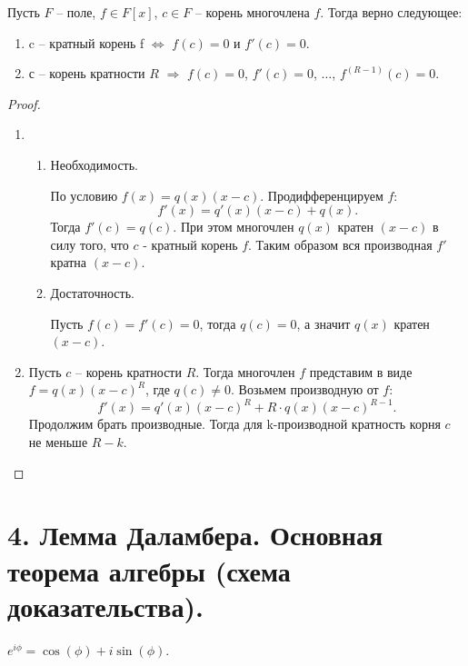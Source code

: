 \begin{theorem}
    Пусть $F$ -- поле, $f \in F[x]$, $c \in F$ -- корень многочлена $f$. Тогда верно следующее:
    \begin{enumerate}
        \item c -- кратный корень f $\Leftrightarrow$ $f(c) = 0$ и $f'(c) = 0$.
        \item с -- корень кратности $R$ $\Rightarrow$ $f(c) = 0$, $f'(c) = 0$, $\dots$, $f^{(R-1)}(c) = 0$.
    \end{enumerate}
\end{theorem}

\begin{proof}~
    \begin{enumerate}
        \item \begin{enumerate}
            \item Необходимость.
            
            По условию $f(x) = q(x) (x-c)$. Продифференцируем $f$:
            $$f'(x) = q'(x) (x-c) + q(x).$$ 
            Тогда $f'(c) = q(c)$. При этом многочлен $q(x)$ кратен $(x-c)$ в силу того, что $c$ - кратный корень $f$. 
            Таким образом вся производная $f'$ кратна $(x-c)$. 
            
            \item Достаточность.
            
            Пусть $f(c) = f'(c) = 0$, тогда $q(c) = 0$, а значит $q(x)$ кратен $(x-c)$.
            
        \end{enumerate}

        \item Пусть $c$ -- корень кратности $R$. Тогда многочлен $f$ представим в виде $f = q(x) (x-c)^R$, где $q(c) \neq 0$.
        Возьмем производную от $f$:
        $$f'(x) = q'(x) (x-c)^R + R \cdot q(x) (x-c)^{R-1}.$$ 
        Продолжим брать производные. Тогда для 
        k-производной кратность корня $c$ не меньше $R-k$.
    \end{enumerate}
\end{proof}

\section{4. Лемма Даламбера. Основная теорема алгебры (схема доказательства).}

\begin{reminder}
    $e^{i\phi} = \cos(\phi) + i\sin(\phi)$.
\end{reminder}


